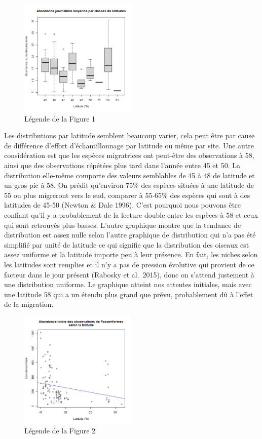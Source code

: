 \documentclass[9pt,twocolumn,twoside,]{pnas-new}
\begin{document}
\begin{figure}
\centering
\includegraphics[width=0.5\textwidth,height=0.4\textheight]{Figure2.png}
\caption{Légende de la Figure 1}
\end{figure}

Les distributions par latitude semblent beaucoup varier, cela peut être
par cause de différence d'effort d'échantillonnage par latitude ou même
par site. Une autre considération est que les espèces migratrices ont
peut-être des observations à 58, ainsi que des observations répétées
plus tard dans l'année entre 45 et 50. La distribution elle-même
comporte des valeurs semblables de 45 à 48 de latitude et un gros pic à
58. On prédit qu'environ 75\% des espèces situées à une latitude de 55
ou plus migreront vers le sud, comparer à 55-65\% des espèces qui sont à
des latitudes de 45-50 (Newton \& Dale 1996). C'est pourquoi nous
pouvons être confiant qu'il y a probablement de la lecture double entre
les espèces à 58 et ceux qui sont retrouvés plus basses. L'autre
graphique montre que la tendance de distribution est assez nulle selon
l'autre graphique de distribution qui n'a pas été simplifié par unité de
latitude ce qui signifie que la distribution des oiseaux est assez
uniforme et la latitude importe peu à leur présence. En fait, les niches
selon les latitudes sont remplies et il n'y a pas de pression évolutive
qui provient de ce facteur dans le jour présent (Rabosky et al.~2015),
donc on s'attend justement à une distribution uniforme. Le graphique
atteint nos attentes initiales, mais avec une latitude 58 qui a un
étendu plus grand que prévu, probablement dû à l'effet de la migration.

\begin{figure}
\centering
\includegraphics[width=0.5\textwidth,height=0.4\textheight]{Figure3.png}
\caption{Légende de la Figure 2}
\end{figure}
\end{document}
